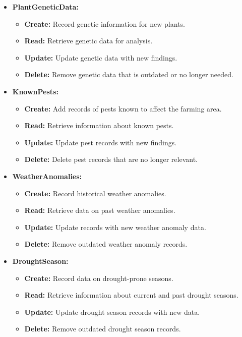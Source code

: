 \begin{itemize}
    \item \textbf{PlantGeneticData:}
    \begin{itemize}
        \item \textbf{Create:} Record genetic information for new plants.
        \item \textbf{Read:} Retrieve genetic data for analysis.
        \item \textbf{Update:} Update genetic data with new findings.
        \item \textbf{Delete:} Remove genetic data that is outdated or no longer needed.
    \end{itemize}

    \item \textbf{KnownPests:}
    \begin{itemize}
        \item \textbf{Create:} Add records of pests known to affect the farming area.
        \item \textbf{Read:} Retrieve information about known pests.
        \item \textbf{Update:} Update pest records with new findings.
        \item \textbf{Delete:} Delete pest records that are no longer relevant.
    \end{itemize}

    \item \textbf{WeatherAnomalies:}
    \begin{itemize}
        \item \textbf{Create:} Record historical weather anomalies.
        \item \textbf{Read:} Retrieve data on past weather anomalies.
        \item \textbf{Update:} Update records with new weather anomaly data.
        \item \textbf{Delete:} Remove outdated weather anomaly records.
    \end{itemize}

    \item \textbf{DroughtSeason:}
    \begin{itemize}
        \item \textbf{Create:} Record data on drought-prone seasons.
        \item \textbf{Read:} Retrieve information about current and past drought seasons.
        \item \textbf{Update:} Update drought season records with new data.
        \item \textbf{Delete:} Remove outdated drought season records.
    \end{itemize}


\end{itemize}
